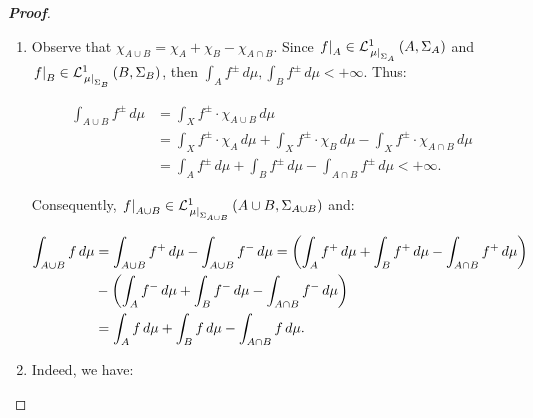 \begin{proposition}
\begin{proof}[\rm\textbf{Proof}]
\begin{enumerate}
      \begin{equation}
        \begin{split}
          \int_{X}{\pr{f+g}\,d\mu} & =\int_{X}{\pr{f+g}^+\,d\mu}-\int_{X}{\pr{f+g}^-\,d\mu}\\
          & =\int_{X}{f^+\,d\mu}-\int_{X}{f^-\,d\mu}+\int_{X}{g^+\,d\mu}-\int_{X}{g^-\,d\mu}\\
          & =\int_{X}{f\,d\mu}+\int_{X}{g\,d\mu}.
        \end{split}
      \end{equation}
      \item Observe that $\chi_{A\cup B}=\chi_A+\chi_B-\chi_{A\cap B}$. Since $\rest{f}{A}\in\Leb{A}{\Sigma_A}{\rest{\mu}{\Sigma_A}}$ and $\rest{f}{B}\in\Leb{B}{\Sigma_B}{\rest{\mu}{\Sigma_B}}$, then $\int_{A}{f^\pm\,d\mu},\int_{B}{f^\pm\,d\mu}<+\infty$. Thus:
      
      \begin{equation}
        \begin{split}
          \int_{A\cup B}{f^{\pm}\,d\mu} & =\int_{X}{f^\pm\cdot\chi_{A\cup B}\,d\mu}\\
          & =\int_{X}{f^\pm\cdot\chi_A\,d\mu}+\int_{X}{f^\pm\cdot\chi_B\,d\mu}-\int_{X}{f^\pm\cdot\chi_{A\cap B}\,d\mu}\\
          &=\int_{A}{f^\pm\,d\mu}+\int_{B}{f^\pm\,d\mu}-\int_{A\cap B}{f^\pm\,d\mu}<+\infty.
        \end{split}
      \end{equation}

      Consequently, $\rest{f}{A\cup B}\in\Leb{A\cup B}{\Sigma_{A\cup B}}{\rest{\mu}{\Sigma_{A\cup B}}}$ and:

      \begin{equation}
        \begin{split}
          \int_{A\cup B}{f\,d\mu} & =\int_{A\cup B}{f^+\,d\mu}-\int_{A\cup B}{f^-\,d\mu}=\pr{\int_{A}{f^+\,d\mu}+\int_{B}{f^+\,d\mu}-\int_{A\cap B}{f^+\,d\mu}}\\
          & -\pr{\int_{A}{f^-\,d\mu}+\int_{B}{f^-\,d\mu}-\int_{A\cap B}{f^-\,d\mu}}\\
          & =\int_{A}{f\,d\mu}+\int_{B}{f\,d\mu}-\int_{A\cap B}{f\,d\mu}.
        \end{split}
      \end{equation}
      \item Indeed, we have:
      

\end{enumerate}
\end{proof}
\end{proposition}
